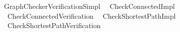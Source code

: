 %
\begin{isabellebody}%
\def\isabellecontext{Graph{\isacharunderscore}Checker{\isacharunderscore}Verification{\isacharunderscore}Simpl}%
%
\isadelimtheory
\isanewline
\isanewline
%
\endisadelimtheory
%
\isatagtheory
{}\isamarkupfalse%
\ Graph{\isacharunderscore}Checker{\isacharunderscore}Verification{\isacharunderscore}Simpl\isanewline
{}\isanewline
\ \ {\isachardoublequoteopen}Check{\isacharunderscore}Connected{\isacharunderscore}Impl{\isachardoublequoteclose}\isanewline
\ \ {\isachardoublequoteopen}Check{\isacharunderscore}Connected{\isacharunderscore}Verification{\isachardoublequoteclose}\isanewline
\ \ {\isachardoublequoteopen}Check{\isacharunderscore}Shortest{\isacharunderscore}Path{\isacharunderscore}Impl{\isachardoublequoteclose}\isanewline
\ \ {\isachardoublequoteopen}Check{\isacharunderscore}Shortest{\isacharunderscore}Path{\isacharunderscore}Verification{\isachardoublequoteclose}\isanewline
\isanewline
{}\isanewline
\isanewline
{}\isamarkupfalse%
%
\endisatagtheory
{\isafoldtheory}%
%
\isadelimtheory
%
\endisadelimtheory
\end{isabellebody}%
